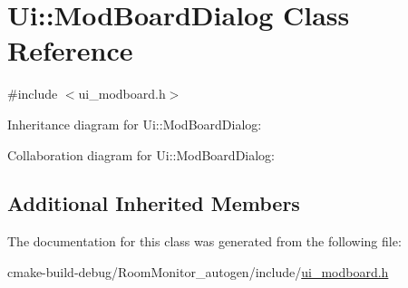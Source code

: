 \hypertarget{class_ui_1_1_mod_board_dialog}{}\section{Ui\+:\+:Mod\+Board\+Dialog Class Reference}
\label{class_ui_1_1_mod_board_dialog}


{\ttfamily \#include $<$ui\+\_\+modboard.\+h$>$}



Inheritance diagram for Ui\+:\+:Mod\+Board\+Dialog\+:


Collaboration diagram for Ui\+:\+:Mod\+Board\+Dialog\+:
\subsection*{Additional Inherited Members}


The documentation for this class was generated from the following file\+:\begin{DoxyCompactItemize}
\item 
cmake-\/build-\/debug/\+Room\+Monitor\+\_\+autogen/include/\hyperlink{ui__modboard_8h}{ui\+\_\+modboard.\+h}\end{DoxyCompactItemize}
